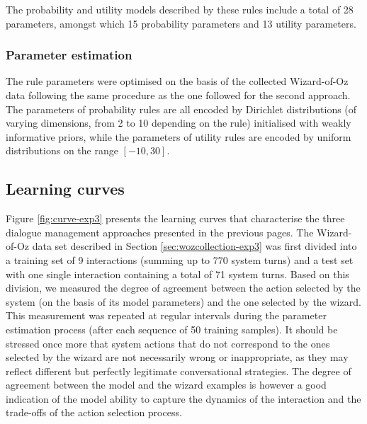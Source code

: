 The probability and utility models described by these rules include a total of 28 parameters, amongst which 15 probability parameters and 13 utility parameters.  

\subsubsection*{Parameter estimation}

The rule parameters were optimised on the basis of the collected Wizard-of-Oz data following the same procedure as the one followed for the second approach.  The parameters of probability rules are all encoded by Dirichlet distributions (of varying dimensions, from 2 to 10 depending on the rule) initialised with weakly informative priors, while the parameters of utility rules are encoded by uniform distributions on the range $[-10, 30]$.  


\subsection{Learning curves}
\label{sec:learningcurve-exp3}

Figure \ref{fig:curve-exp3} presents the learning curves that characterise the three dialogue management approaches presented in the previous pages. The Wizard-of-Oz data set described in Section \ref{sec:wozcollection-exp3} was first divided into a training set of 9 interactions (summing up to 770 system turns) and a test set with one single interaction containing a total of 71 system turns. Based on this division, we measured the degree of agreement between the action selected by the system (on the basis of its model parameters) and the one selected by the wizard. This measurement was repeated at regular intervals during the parameter estimation process (after each sequence of 50 training samples).  It should be stressed once more that system actions that do not correspond to the ones selected by the wizard are not necessarily wrong or inappropriate, as they may reflect different but perfectly legitimate conversational strategies. The degree of agreement between the model and the wizard examples is however a good indication of the model ability to capture the dynamics of the interaction and the trade-offs of the action selection process. 


